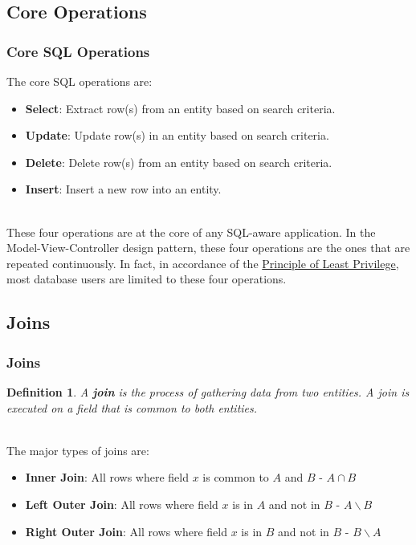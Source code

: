\documentclass[aspectratio=169]{beamer}
\newtheorem{defn}{Definition}
\begin{document}
\subsection{Core Operations}
\begin{frame}
\frametitle{Core SQL Operations}
The core SQL operations are:
\begin{itemize}
	\item \textbf{Select}: Extract row(s) from an entity based on search criteria.
	\item \textbf{Update}: Update row(s) in an entity based on search criteria.
	\item \textbf{Delete}: Delete row(s) from an entity based on search criteria.
	\item \textbf{Insert}: Insert a new row into an entity.
\end{itemize}

\mbox{}\\
These four operations are at the core of any SQL-aware application. In the Model-View-Controller design pattern, these four operations are the ones that are repeated continuously. In fact, in accordance of the \href{https://www.owasp.org/index.php/Least_privilege}{Principle of Least Privilege}, most database users are limited to these four operations.
\end{frame}

\subsection{Joins}
\begin{frame}
\frametitle{Joins}
\begin{defn}
A \textbf{join} is the process of gathering data from two entities. A join is executed on a field that is common to both entities.
\end{defn}
\mbox{}\\
The major types of joins are:
\begin{itemize}
	\item \textbf{Inner Join}: All rows where field $x$ is common to $A$ and $B$ - $A \cap B$
	\item \textbf{Left Outer Join}: All rows where field $x$ is in $A$ and not in $B$ - $A \backslash B$
	\item \textbf{Right Outer Join}: All rows where field $x$ is in $B$ and not in $B$ - $B \backslash A$ 
\end{itemize}
\end{frame}
\end{document}
